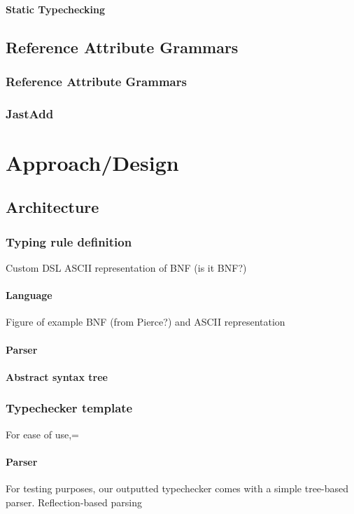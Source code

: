 \documentclass[nofilelist]{cslthse-msc}
\begin{document}
\subsubsection{Static Typechecking}
\section{Reference Attribute Grammars}
\subsection{Reference Attribute Grammars}
\subsection{JastAdd}

\chapter{Approach/Design} %

\section{Architecture}

\subsection{Typing rule definition}
Custom DSL
ASCII representation of BNF (is it BNF?)
\subsubsection{Language}
Figure of example BNF (from Pierce?) and ASCII representation
\subsubsection{Parser}
\subsubsection{Abstract syntax tree}

\subsection{Typechecker template}
For ease of use,=
\subsubsection{Parser}
For testing purposes, our outputted typechecker comes with a simple tree-based parser.
Reflection-based parsing
\end{document}
